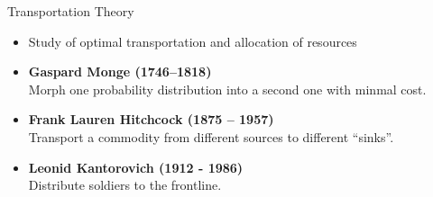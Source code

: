 \begin{alertblock}{Transportation Theory}
	\begin{itemize}
		\item Study of optimal transportation and allocation of resources
		\item \textbf{Gaspard Monge (1746–1818)} \\ Morph one probability distribution into a second one with minmal cost.
		\item \textbf{Frank Lauren Hitchcock (1875 – 1957)} \\ Transport a commodity from different sources to different ``sinks''.
		\item \textbf{Leonid Kantorovich (1912 - 1986)} \\ Distribute soldiers to the frontline.
	\end{itemize}
\end{alertblock}